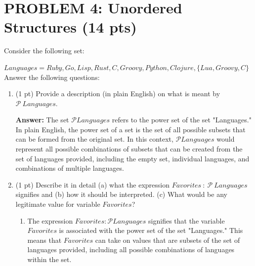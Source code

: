 \documentclass[12pt]{article}
\begin{document}
\begin{spacing}{1.5}
\begin{enumerate}
\begin{center}
		      \end{center}
		      		      		      		      		        
	\end{enumerate}	    
	\newpage
	\section*{PROBLEM 4: Unordered Structures (14 pts)}
					
	Consider the following set:
				
	$Languages=Ruby, Go, Lisp, Rust, C, Groovy, Python, Clojure, \{Lua, Groovy, C\}$\\
				
	Answer the following questions:
				
	\begin{enumerate}
		\item (1 pt) Provide a description (in plain English) on what is meant by $\mathcal{P} \: Languages$.
		      		      		      		      
		      \textbf{Answer:} The set $\mathcal{P} Languages$ refers to the power set of the set "Languages." In plain English, the power set of a set is the set of all possible subsets that can be formed from the original set. In this context, $\mathcal{P} Languages$ would represent all possible combinations of subsets that can be created from the set of languages provided, including the empty set, individual languages, and combinations of multiple languages.\\
		      		      		      		      
		\item (1 pt) Describe it in detail (a) what the expression $Favorites\: : \: \mathcal{P} \: Languages$ signifies and (b) how it should be interpreted. (c) What would be any legitimate value for variable $Favorites$?
		      		      		      		      
		      \begin{enumerate}
		      	\item The expression $Favorites : \mathcal{P} Languages$ signifies that the variable $Favorites$ is associated with the power set of the set "Languages." This means that $Favorites$ can take on values that are subsets of the set of languages provided, including all possible combinations of languages within the set. 
		      	      		      	      		      	      		      	                      

\end{enumerate}
\end{enumerate}
\end{spacing}
\end{document}
